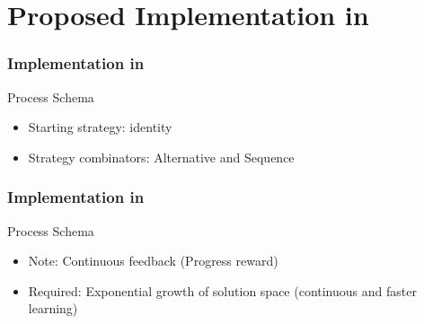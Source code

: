 \documentclass[xcolor=table%
,t]{beamer}
\begin{document}
\section{Proposed Implementation in \tct{}}


\begin{frame}
  \frametitle{Implementation in \tct{}}

  \begin{block}{Process Schema}
    \centering
    \resizebox{0.9\linewidth}{!}{}
    \begin{itemize}
    \item Starting strategy: identity
    \item Strategy combinators: Alternative and Sequence

    \end{itemize}
  \end{block}
\end{frame}

\begin{frame}
  \frametitle{Implementation in \tct{}}

  \begin{block}{Process Schema}
    \centering
    \resizebox{0.9\linewidth}{!}{}
    \begin{itemize}
    \item Note: Continuous feedback (\textsf{Progress reward})
    \item Required: Exponential growth of solution space (continuous and faster learning)
    \end{itemize}
  \end{block}
\end{frame}
\end{document}
